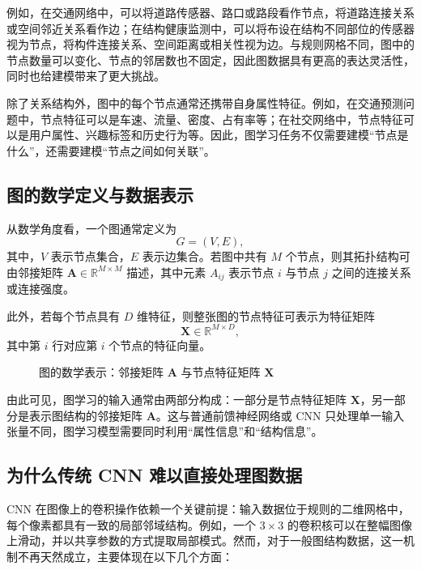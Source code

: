 例如，在交通网络中，可以将道路传感器、路口或路段看作节点，将道路连接关系或空间邻近关系看作边；在结构健康监测中，可以将布设在结构不同部位的传感器视为节点，将构件连接关系、空间距离或相关性视为边。与规则网格不同，图中的节点数量可以变化、节点的邻居数也不固定，因此图数据具有更高的表达灵活性，同时也给建模带来了更大挑战。

除了关系结构外，图中的每个节点通常还携带自身属性特征。例如，在交通预测问题中，节点特征可以是车速、流量、密度、占有率等；在社交网络中，节点特征可以是用户属性、兴趣标签和历史行为等。因此，图学习任务不仅需要建模“节点是什么”，还需要建模“节点之间如何关联”。

\subsection{图的数学定义与数据表示}

从数学角度看，一个图通常定义为
\begin{equation}
    G = (V, E),
\end{equation}
其中，$V$ 表示节点集合，$E$ 表示边集合。若图中共有 $M$ 个节点，则其拓扑结构可由邻接矩阵 $\mathbf{A} \in \mathbb{R}^{M \times M}$ 描述，其中元素 $A_{ij}$ 表示节点 $i$ 与节点 $j$ 之间的连接关系或连接强度。

此外，若每个节点具有 $D$ 维特征，则整张图的节点特征可表示为特征矩阵
\begin{equation}
    \mathbf{X} \in \mathbb{R}^{M \times D},
\end{equation}
其中第 $i$ 行对应第 $i$ 个节点的特征向量。

\begin{figure}[H]
  \centering
  \resizebox{0.95\textwidth}{!}{}
  \caption{图的数学表示：邻接矩阵 $\mathbf{A}$ 与节点特征矩阵 $\mathbf{X}$}
  \label{fig:ch09_orig18}
\end{figure}

由此可见，图学习的输入通常由两部分构成：一部分是节点特征矩阵 $\mathbf{X}$，另一部分是表示图结构的邻接矩阵 $\mathbf{A}$。这与普通前馈神经网络或 CNN 只处理单一输入张量不同，图学习模型需要同时利用“属性信息”和“结构信息”。

\subsection{为什么传统 CNN 难以直接处理图数据}

CNN 在图像上的卷积操作依赖一个关键前提：输入数据位于规则的二维网格中，每个像素都具有一致的局部邻域结构。例如，一个 $3\times 3$ 的卷积核可以在整幅图像上滑动，并以共享参数的方式提取局部模式。然而，对于一般图结构数据，这一机制不再天然成立，主要体现在以下几个方面：

